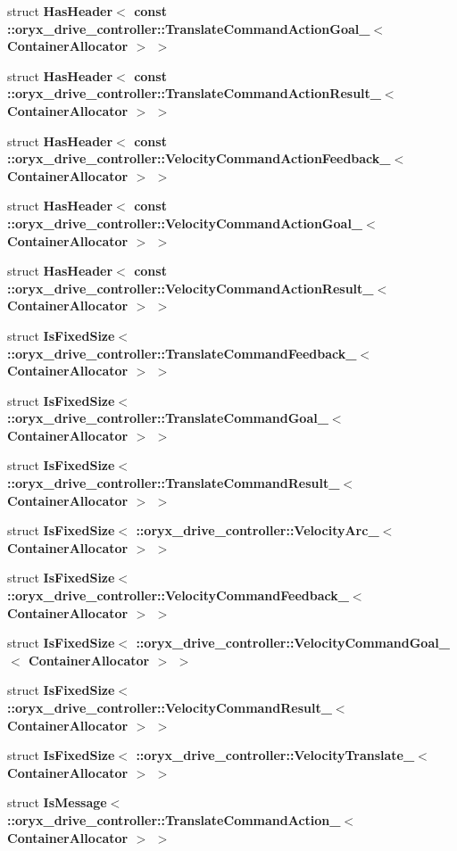 \begin{DoxyCompactItemize}
struct {\bf \-Has\-Header$<$ const \-::oryx\-\_\-drive\-\_\-controller\-::\-Translate\-Command\-Action\-Goal\-\_\-$<$ Container\-Allocator $>$ $>$}
\item 
struct {\bf \-Has\-Header$<$ const \-::oryx\-\_\-drive\-\_\-controller\-::\-Translate\-Command\-Action\-Result\-\_\-$<$ Container\-Allocator $>$ $>$}
\item 
struct {\bf \-Has\-Header$<$ const \-::oryx\-\_\-drive\-\_\-controller\-::\-Velocity\-Command\-Action\-Feedback\-\_\-$<$ Container\-Allocator $>$ $>$}
\item 
struct {\bf \-Has\-Header$<$ const \-::oryx\-\_\-drive\-\_\-controller\-::\-Velocity\-Command\-Action\-Goal\-\_\-$<$ Container\-Allocator $>$ $>$}
\item 
struct {\bf \-Has\-Header$<$ const \-::oryx\-\_\-drive\-\_\-controller\-::\-Velocity\-Command\-Action\-Result\-\_\-$<$ Container\-Allocator $>$ $>$}
\item 
struct {\bf \-Is\-Fixed\-Size$<$ \-::oryx\-\_\-drive\-\_\-controller\-::\-Translate\-Command\-Feedback\-\_\-$<$ Container\-Allocator $>$ $>$}
\item 
struct {\bf \-Is\-Fixed\-Size$<$ \-::oryx\-\_\-drive\-\_\-controller\-::\-Translate\-Command\-Goal\-\_\-$<$ Container\-Allocator $>$ $>$}
\item 
struct {\bf \-Is\-Fixed\-Size$<$ \-::oryx\-\_\-drive\-\_\-controller\-::\-Translate\-Command\-Result\-\_\-$<$ Container\-Allocator $>$ $>$}
\item 
struct {\bf \-Is\-Fixed\-Size$<$ \-::oryx\-\_\-drive\-\_\-controller\-::\-Velocity\-Arc\-\_\-$<$ Container\-Allocator $>$ $>$}
\item 
struct {\bf \-Is\-Fixed\-Size$<$ \-::oryx\-\_\-drive\-\_\-controller\-::\-Velocity\-Command\-Feedback\-\_\-$<$ Container\-Allocator $>$ $>$}
\item 
struct {\bf \-Is\-Fixed\-Size$<$ \-::oryx\-\_\-drive\-\_\-controller\-::\-Velocity\-Command\-Goal\-\_\-$<$ Container\-Allocator $>$ $>$}
\item 
struct {\bf \-Is\-Fixed\-Size$<$ \-::oryx\-\_\-drive\-\_\-controller\-::\-Velocity\-Command\-Result\-\_\-$<$ Container\-Allocator $>$ $>$}
\item 
struct {\bf \-Is\-Fixed\-Size$<$ \-::oryx\-\_\-drive\-\_\-controller\-::\-Velocity\-Translate\-\_\-$<$ Container\-Allocator $>$ $>$}
\item 
struct {\bf \-Is\-Message$<$ \-::oryx\-\_\-drive\-\_\-controller\-::\-Translate\-Command\-Action\-\_\-$<$ Container\-Allocator $>$ $>$}
\item 

\end{DoxyCompactItemize}

